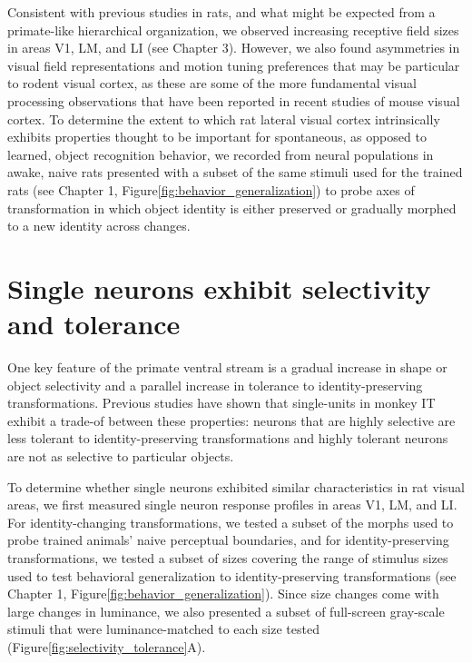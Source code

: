 Consistent with previous studies in rats, and what might be expected from a primate-like hierarchical organization, we observed increasing receptive field sizes in areas V1, LM, and LI (see Chapter 3). However, we also found asymmetries in visual field representations and motion tuning preferences that may be particular to rodent visual cortex, as these are some of the more fundamental visual processing observations that have been reported in recent studies of mouse visual cortex\cite{Liang2018a, Sit2020, Murgas2020}. To determine the extent to which rat lateral visual cortex intrinsically exhibits properties thought to be important for spontaneous, as opposed to learned, object recognition behavior, we recorded from neural populations in awake, naive rats presented with a subset of the same stimuli used for the trained rats (see Chapter 1, Figure\ref{fig:behavior_generalization}) to probe axes of transformation in which object identity is either preserved or gradually morphed to a new identity across changes.

\section{Single neurons exhibit selectivity and tolerance}
One key feature of the primate ventral stream is a gradual increase in shape or object selectivity and a parallel increase in tolerance to identity-preserving transformations. Previous studies have shown that single-units in monkey IT exhibit a trade-of between these properties: neurons that are highly selective are less tolerant to identity-preserving transformations and highly tolerant neurons are not as selective to particular objects\cite{Zoccolan2007}.

To determine whether single neurons exhibited similar characteristics in rat visual areas, we first measured single neuron response profiles in areas V1, LM, and LI. For identity-changing transformations, we tested a subset of the morphs used to probe trained animals’ naive perceptual boundaries, and for identity-preserving transformations, we tested a subset of sizes covering the range of stimulus sizes used to test behavioral generalization to identity-preserving transformations (see Chapter 1, Figure\ref{fig:behavior_generalization}). Since size changes come with large changes in luminance, we also presented a subset of full-screen gray-scale stimuli that were luminance-matched to each size tested (Figure\ref{fig:selectivity_tolerance}A).

